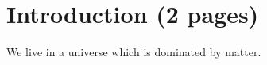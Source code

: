 
\chapter{Introduction (2 pages)}
\label{sec:Introduction}

We live in a universe which is dominated by matter.
